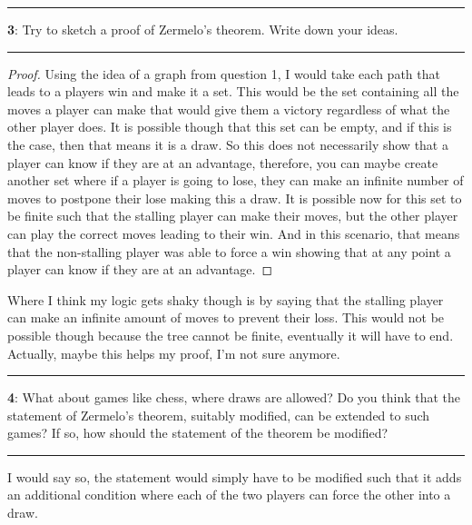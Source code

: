 \documentclass[11pt]{article}
\newcommand\question[2]{\vspace{.25in}\hrule\textbf{#1}: #2\vspace{.5em}\hrule\vspace{.10in}}
\begin{document}
\question{3}{Try to sketch a proof of Zermelo's theorem. Write down your ideas.}

\begin{proof}
	Using the idea of a graph from question 1, I would take each path that leads to a players win and make it a set. This would be the set containing all the moves a player can make that would give them a victory regardless of what the other player does. It is possible though that this set can be empty, and if this is the case, then that means it is a draw. So this does not necessarily show that a player can know if they are at an advantage, therefore, you can maybe create another set where if a player is going to lose, they can make an infinite number of moves to postpone their lose making this a draw. It is possible now for this set to be finite such that the stalling player can make their moves, but the other player can play the correct moves leading to their win. And in this scenario, that means that the non-stalling player was able to force a win showing that at any point a player can know if they are at an advantage.
\end{proof}
Where I think my logic gets shaky though is by saying that the stalling player can make an infinite amount of moves to prevent their loss. This would not be possible though because the tree cannot be finite, eventually it will have to end. Actually, maybe this helps my proof, I'm not sure anymore.

\question{4}{What about games like chess, where draws are allowed? Do you think that the statement of Zermelo's theorem, suitably modified, can be extended to such games? If so, how should the statement of the theorem be modified?}

I would say so, the statement would simply have to be modified such that it adds an additional condition where each of the two players can force the other into a draw. 





	
\end{document}
